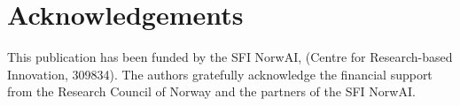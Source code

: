 \documentclass[aps,pre,twocolumn,superscriptaddress,floatfix]{revtex4-2}
\begin{document}
\section{Acknowledgements}
This publication has been funded by the SFI NorwAI, (Centre for Research-based Innovation, 309834). The authors gratefully acknowledge the financial support from the Research Council of Norway and the partners of the SFI NorwAI.


% 

\end{document}
